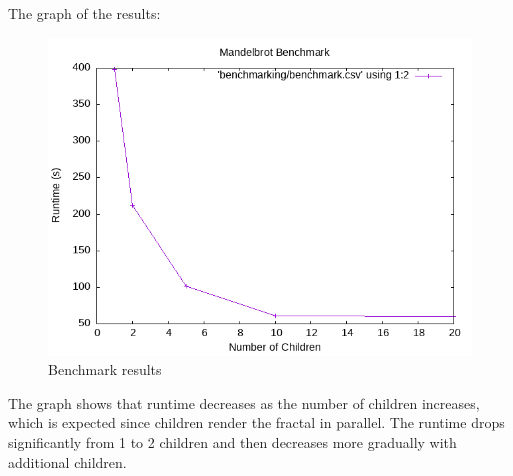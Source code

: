 \documentclass{assignment}
\begin{document}
The graph of the results:

\begin{figure}
    \centering
    \includegraphics[width=0.8\linewidth]{images/benchmark.png}
    \caption{Benchmark results}
\end{figure}

The graph shows that runtime decreases as the number of children increases, which is expected since children render the fractal in parallel. The runtime drops significantly from 1 to 2 children and then decreases more gradually with additional children.


\end{document}
